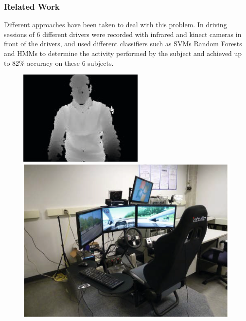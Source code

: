 \documentclass{beamer}
\begin{document}
	\begin{frame}
		\frametitle{Related Work}
		Different approaches have been taken to deal with this problem. In \cite{Ragab2014} driving sessions of 6 different drivers were recorded with infrared and kinect cameras in front of the drivers, and used different classifiers such as SVMs Random Forests and HMMs to determine the activity performed by the subject and achieved up to 82\% accuracy on these 6 subjects. 
		
		
		\begin{figure}
			\includegraphics{RanFor}
			\includegraphics[scale = .365]{RanForSim}
		\end{figure}
		\begin{figure}
			
			
			
		\end{figure}
	\end{frame}
	
	
%		
		
\end{document}

